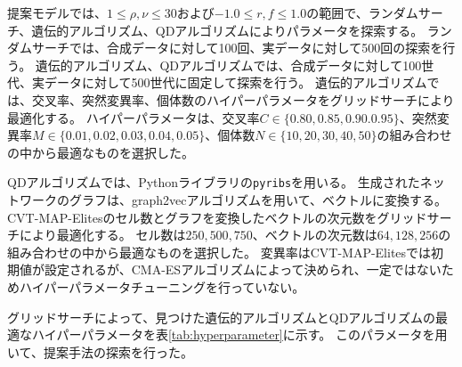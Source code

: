 \documentclass[uplatex,11pt,openany]{ujreport}
\begin{document}
        提案モデルでは、$1\leq \rho,\nu \leq30$および$-1.0\leq r,f\leq 1.0$の範囲で、ランダムサーチ、遺伝的アルゴリズム、QDアルゴリズムによりパラメータを探索する。
        ランダムサーチでは、合成データに対して100回、実データに対して500回の探索を行う。
        遺伝的アルゴリズム、QDアルゴリズムでは、合成データに対して100世代、実データに対して500世代に固定して探索を行う。
        遺伝的アルゴリズムでは、交叉率、突然変異率、個体数のハイパーパラメータをグリッドサーチにより最適化する。
        ハイパーパラメータは、交叉率$C\in\{0.80,0.85,0.90.0.95\}$、突然変異率$M\in\{0.01,0.02,0.03,0.04,0.05\}$、個体数$N\in\{10,20,30,40,50\}$の組み合わせの中から最適なものを選択した。

        QDアルゴリズムでは、Pythonライブラリの\texttt{pyribs}\cite{tjanakaPyribsBareBonesPython2023}を用いる。
        生成されたネットワークのグラフは、graph2vecアルゴリズムを用いて、ベクトルに変換する。
        CVT-MAP-Elitesのセル数とグラフを変換したベクトルの次元数をグリッドサーチにより最適化する。
        セル数は$250,500,750$、ベクトルの次元数は$64,128,256$の組み合わせの中から最適なものを選択した。
        変異率はCVT-MAP-Elitesでは初期値が設定されるが、CMA-ESアルゴリズム\cite{hansenReducingTimeComplexity2003}によって決められ、一定ではないためハイパーパラメータチューニングを行っていない。

        グリッドサーチによって、見つけた遺伝的アルゴリズムとQDアルゴリズムの最適なハイパーパラメータを表\ref{tab:hyperparameter}に示す。
        このパラメータを用いて、提案手法の探索を行った。
\end{document}
